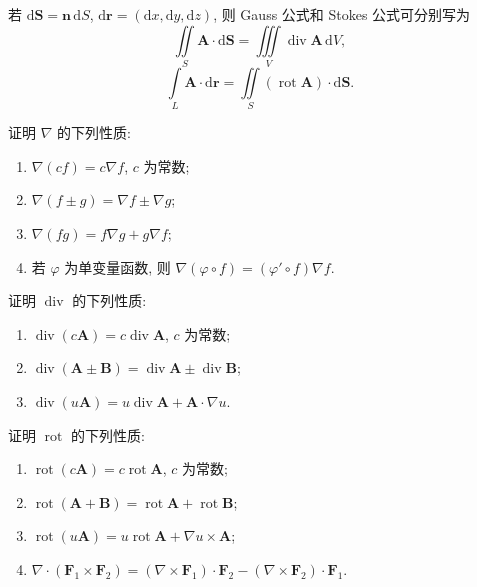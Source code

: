 \documentclass[../数学分析培优讲义.tex]{subfiles}
\begin{document}
\begin{remark}
若 $\mathrm{d}\bm S=\bm n\,\mathrm{d}S$, $\mathrm{d}\bm r=(\mathrm{d}x,\mathrm{d}y,\mathrm{d}z)$, 则 Gauss 公式和 Stokes 公式可分别写为
\[
    \iint\limits_S\bm A\cdot\mathrm{d}\bm S
    =\iiint\limits_V\operatorname{div}\bm A\,\mathrm{d}V,
\]
\[
    \int\limits_L\bm A\cdot\mathrm{d}\bm r
    =\iint\limits_S(\operatorname{rot}\bm A)\cdot\mathrm{d}\bm S.
\]
\end{remark}

\begin{example}
证明 $\nabla$ 的下列性质:
\begin{enumerate}[label=(\arabic*)]
    \item $\nabla(cf)=c\nabla f$, $c$ 为常数;
    \item $\nabla(f\pm g)=\nabla f\pm\nabla g$;
    \item $\nabla(fg)=f\nabla g+g\nabla f$;
    \item 若 $\varphi$ 为单变量函数, 则 $\nabla(\varphi\circ f)=(\varphi'\circ f)\nabla f$.
\end{enumerate}
\end{example}
\exampleblank

\begin{example}
证明 $\operatorname{div}$ 的下列性质:
\begin{enumerate}[label=(\arabic*)]
    \item $\operatorname{div}(c\bm A)=c\operatorname{div}\bm A$, $c$ 为常数;
    \item $\operatorname{div}(\bm A\pm\bm B)=\operatorname{div}\bm A\pm\operatorname{div}\bm B$;
    \item $\operatorname{div}(u\bm A)=u\operatorname{div}\bm A+\bm A\cdot\nabla u$.
\end{enumerate}
\end{example}
\exampleblank

\begin{example}
证明 $\operatorname{rot}$ 的下列性质:
\begin{enumerate}[label=(\arabic*)]
    \item $\operatorname{rot}(c\bm A)=c\operatorname{rot}\bm A$, $c$ 为常数;
    \item $\operatorname{rot}(\bm A+\bm B)=\operatorname{rot}\bm A+\operatorname{rot}\bm B$;
    \item $\operatorname{rot}(u\bm A)=u\operatorname{rot}\bm A+\nabla u\times\bm A$;
    \item $\nabla\cdot(\bm F_1\times\bm F_2)=(\nabla\times\bm F_1)\cdot\bm F_2-(\nabla\times\bm F_2)\cdot\bm F_1$.
\end{enumerate}
\end{example}
\exampleblank
\end{document}
